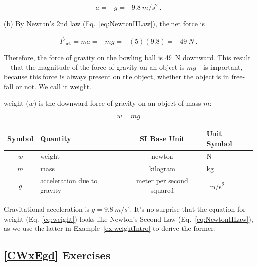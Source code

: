 \documentclass{article}
\numberwithin{equation}{section}
\numberwithin{figure}{section}
\begin{document}
\begin{equation*}
    a = -g = -\SI{9.8}{m/s^2}\ .
\end{equation*}

(b) By Newton's 2nd law (Eq.~\ref{eq:NewtonIILaw}), the net force is

\begin{equation*}
    \vec{F}_{\text{net}} = m a = -m g = -(5)(9.8) = -\SI{49}{N}\ .
\end{equation*}

Therefore, the force of gravity on the bowling ball is \SI{49}{N} downward. This result---that the magnitude of the force of gravity on an object is $mg$---is important, because this force is always present on the object, whether the object is in free-fall or not. We call it weight.

\begin{mdframed}[backgroundcolor=black!10]
\Gls{weight} ($w$) is the downward force of gravity on an object of mass $m$:

\begin{equation} \label{eq:weight} 
    w = mg
\end{equation}

\begin{center}
    \begin{tabular}{cl|cl}
    \hline
    \textbf{Symbol} & \textbf{Quantity} & \textbf{SI Base Unit} & \textbf{Unit Symbol}  \\
    \hline\hline
    \rule{0pt}{2.5ex}
        $w$ & weight & newton & N\\
        $m$ & mass & kilogram & kg\\
        $g$ & acceleration due to gravity & meter per second squared & \SI{}{m/s^2}\\
    \hline
    \end{tabular}
\end{center}

Gravitational acceleration is $g = \SI{9.8}{m/s^2}$. It's no surprise that the equation for weight (Eq.~\ref{eq:weight}) looks like Newton's Second Law (Eq.~\ref{eq:NewtonIILaw}), as we use the latter in Example~\ref{ex:weightIntro} to derive the former. 
\end{mdframed}

\cyanhrule

\subsection*{\ref{CWxEgd} Exercises}
\end{document}
